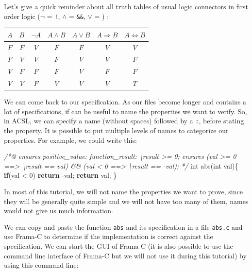 \documentclass[12pt,francais,]{scrbook}
\newenvironment{Shaded}{}{}
\newcommand{\KeywordTok}[1]{\textcolor[rgb]{0.00,0.44,0.13}{\textbf{{#1}}}}
\newcommand{\DataTypeTok}[1]{\textcolor[rgb]{0.56,0.13,0.00}{{#1}}}
\newcommand{\DecValTok}[1]{\textcolor[rgb]{0.25,0.63,0.44}{{#1}}}
\newcommand{\CommentTok}[1]{\textcolor[rgb]{0.38,0.63,0.69}{\textit{{#1}}}}
\newcommand{\NormalTok}[1]{{#1}}
\newenvironment{zdsblock}[1]{%
  \tcolorbox[beamer,%
    noparskip,breakable,
    colback=LightBlue,colframe=DarkBlue,%
    colbacklower=DarkBlue,%
    title=#1]
}{\endtcolorbox}
\begin{document}
\begin{zdsblock}{Information}
Let's give a quick reminder about all
truth tables of usual logic connectors in first order logic
(\(\neg\) = \texttt{!}, \(\wedge\) = \texttt{\&\&}, \(\vee\) =
\texttt{\textbar{}\textbar{}}) :
\begin{longtable}[]{@{}ccccccc@{}}
\(A\) & \(B\) & \(\neg A\) & \(A \wedge B\) & \(A \vee B\) & \(A \Rightarrow B\) & \(A \Leftrightarrow B\)\tabularnewline
\midrule
\endhead
\(F\) & \(F\) & \(V\) & \(F\) & \(F\) & \(V\) &\(V\)\tabularnewline
\(F\) & \(V\) & \(V\) & \(F\) & \(V\) & \(V\) &\(F\)\tabularnewline
\(V\) & \(F\) & \(F\) & \(F\) & \(V\) & \(F\) &\(F\)\tabularnewline
\(V\) & \(V\) & \(F\) & \(V\) & \(V\) & \(V\) &\(T\)\tabularnewline
\bottomrule
\end{longtable}
\end{zdsblock}

We can come back to our specification. As our files become longer and
contains a lot of specifications, if can be useful to name the
properties we want to verify. So, in ACSL, we can specify a name
(without spaces) followed by a \texttt{:}, before stating the property.
It is possible to put multiple levels of names to categorize our
properties. For example, we could write this:

\begin{footnotesize}\begin{Shaded}
\begin{Highlighting}[]
\CommentTok{/*@}
\CommentTok{  ensures positive_value: function_result: \textbackslash{}result >= 0;}
\CommentTok{  ensures (val >= 0 ==> \textbackslash{}result == val) && }
\CommentTok{          (val < 0 ==> \textbackslash{}result == -val);}
\CommentTok{*/}
\DataTypeTok{int} \NormalTok{abs(}\DataTypeTok{int} \NormalTok{val)\{}
  \KeywordTok{if}\NormalTok{(val < }\DecValTok{0}\NormalTok{) }\KeywordTok{return} \NormalTok{-val;}
  \KeywordTok{return} \NormalTok{val;}
\NormalTok{\}}
\end{Highlighting}
\end{Shaded}\end{footnotesize}

In most of this tutorial, we will not name the properties we want to
prove, since they will be generally quite simple and we will not have
too many of them, names would not give us much information.

We can copy and paste the function \texttt{abs} and its specification in
a file \texttt{abs.c} and use Frama-C to determine if the implementation
is correct against the specification. We can start the GUI of Frama-C
(it is also possible to use the command line interface of Frama-C but we
will not use it during this tutorial) by using this command line:
\end{document}
